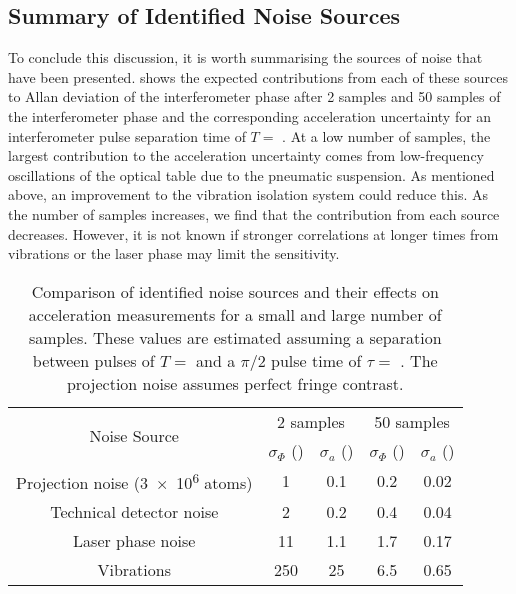 \subsection{Summary of Identified Noise Sources}\label{subsec:noise_sources}
To conclude this discussion, it is worth summarising the
sources of noise that have been presented. 
 shows the expected contributions from
each of these sources to Allan deviation of the interferometer phase after 2 samples and 50
samples of the
interferometer phase and the corresponding acceleration uncertainty
for an interferometer pulse separation time of $T =$
. At a low number of samples, the largest
contribution to the acceleration uncertainty comes from low-frequency
oscillations of the optical table due to the pneumatic suspension. As mentioned above, an improvement to the
vibration isolation system could reduce this. As the
number of samples increases, we find that the contribution from each
source decreases. However, it is not known if stronger correlations at
longer times from vibrations or the laser phase may limit the
sensitivity.
\begin{table}[htpb!]
  \centering
  \begin{tabular}{ccccc}
    \toprule
    \multirow{2}{*}{Noise Source}  & \multicolumn{2}{c}{2 samples} &
    \multicolumn{2}{c}{50 samples} \\
                                  & $\sigma_{\Phi}$  (\sivalue{}{\milli\radian})  &\(\sigma_a\)
    (\sivalue{}{\micro\meter\per\s\squared}) &
    $\sigma_{\Phi}$  (\sivalue{}{\milli\radian})&\(\sigma_a\)
    (\sivalue{}{\micro\meter\per\s\squared})\\
    \midrule
    Projection noise (\num{3e6} atoms) & 1 & 0.1 & 0.2& 0.02 \\
    Technical detector noise & 2 & 0.2 & 0.4 & 0.04\\
    Laser phase noise  & 11 & 1.1 & 1.7 & 0.17\\
    Vibrations & 250 & 25 & 6.5 & 0.65\\
    \bottomrule
  \end{tabular}
  \caption[Comparison of known noise sources.]{Comparison of
    identified noise sources and their effects on
  acceleration measurements for a small and large number of samples. These values are estimated assuming a
separation between pulses of \(T = \)  and a \(\pi/2\)
pulse time of \(\tau = \) . The projection noise
assumes perfect fringe contrast.}
  \label{tab:noise_sources}
\end{table}

